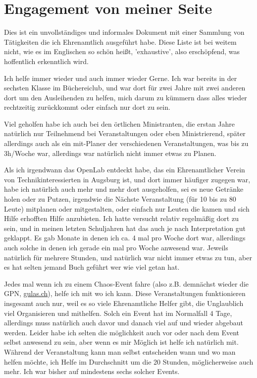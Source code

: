 \documentclass{scrartcl}
\begin{document}
\section*{Engagement von meiner Seite}
Dies ist ein unvollständiges und informales Dokument mit einer Sammlung von Tätigkeiten
die ich Ehrenamtlich ausgeführt habe. Diese Liste ist bei weitem nicht, wie es im Englischen so
schön heißt, 'exhaustive', also erschöpfend, was hoffentlich erkenntlich wird.

Ich helfe immer wieder und auch immer wieder Gerne. Ich war bereits in der sechsten Klasse im
Büchereiclub, und war dort für zwei Jahre mit zwei anderen dort um den Ausleihenden zu helfen,
mich darum zu kümmern dass alles wieder rechtzeitig zurückkommt oder einfach nur dort zu sein.

Viel geholfen habe ich auch bei den örtlichen Ministranten, die erstan Jahre natürlich nur
Teilnehmend bei Veranstaltungen oder eben Ministrierend, später allerdings auch als ein
mit-Planer der verschiedenen Veranstaltungen, was bis zu 3h/Woche war, allerdings war natürlich
nicht immer etwas zu Planen.

Als ich irgendwann das OpenLab entdeckt habe, das ein Ehrenamtlicher
Verein von Technikinteressierten in Augsburg ist, und dort immer häufiger zugegen war, habe ich
natürlich auch mehr und mehr dort ausgeholfen, sei es neue Getränke holen oder zu Putzen, irgendwie
die Nächste Veranstaltung (für 10 bis zu 80 Leute) mitplanen oder mitgestalten, oder einfach nur
Leuten die kamen und sich Hilfe erhofften Hilfe anzubieten. Ich hatte versucht relativ regelmäßig
dort zu sein, und in meinen letzten Schuljahren hat das auch je nach Interpretation gut geklappt.
Es gab Monate in denen ich ca. 4 mal pro Woche dort war, allerdings auch solche in denen ich gerade ein
mal pro Woche anwesend war. Jeweils natürlich für mehrere Stunden, und natürlich war nicht immer
etwas zu tun, aber es hat selten jemand Buch geführt wer wie viel getan hat.

Jedes mal wenn ich zu einem Chaos-Event fahre (also z.B. demnächst wieder die GPN, \url{gulas.ch}),
helfe ich mit wo ich kann. Diese Veranstaltungen funktionieren insgesamt auch nur, weil es so viele
Ehrenamtliche Helfer gibt, die Unglaublich viel Organisieren und mithelfen. Solch ein Event hat
im Normalfall 4 Tage, allerdings muss natürlich auch davor und danach viel auf und wieder abgebaut
werden. Leider habe ich selten die möglichkeit auch vor oder nach dem Event selbst anwesend zu sein,
aber wenn es mir Möglich ist helfe ich natürlich mit. Während der Veranstaltung kann man selbst
entscheiden wann und wo man helfen möchte, ich Helfe im Durchschnitt um die 20 Stunden, möglicherweise
auch mehr. Ich war bisher auf mindestens sechs solcher Events.
\end{document}
